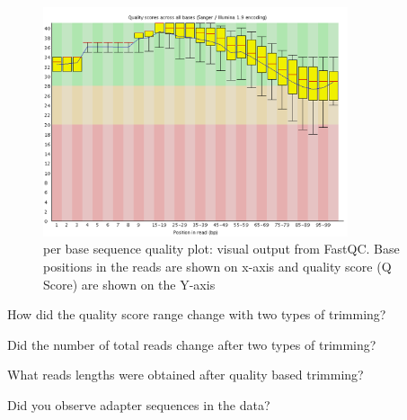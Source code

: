\begin{steps}
\begin{figure}[H]
\centering
\includegraphics[width=0.8\textwidth]{ngs-qc/bad_example_quality_trimmed.png}
\caption{per base sequence quality plot: visual output from FastQC. Base positions in the reads are shown on x-axis and quality score (Q Score) are shown on the Y-axis}
\label{fig:bad_example_quality_trimmed_plot}
\end{figure}

\end{steps}

\begin{questions}
How did the quality score range change with two types of trimming?

Did the number of total reads change after two types of trimming?

What reads lengths were obtained after quality based trimming?

Did you observe adapter sequences in the data?

\end{questions}

